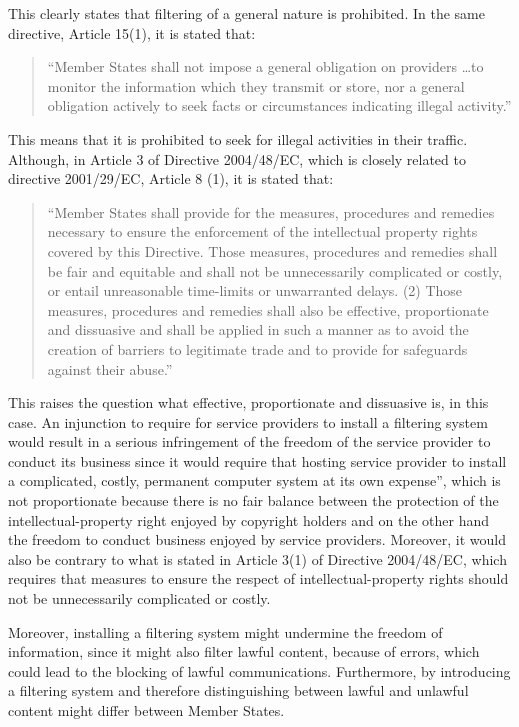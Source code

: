 This clearly states that filtering of a general nature is prohibited. In the same directive, Article 15(1), it is stated that: 

\begin{quote}``Member States shall not impose a general obligation on providers \dots to monitor the information which they transmit or store, nor a general obligation actively to seek facts or circumstances indicating illegal activity.'' \end{quote}

This means that it is prohibited to seek for illegal activities in their traffic. Although, in Article 3 of Directive 2004/48/EC, which is closely related to directive 2001/29/EC, Article 8 (1), it is stated that: 

\begin{quote}``Member States shall provide for the measures, procedures and remedies necessary to ensure the enforcement of the intellectual property rights covered by this Directive. Those measures, procedures and remedies shall be fair and equitable and shall not be unnecessarily complicated or costly, or entail unreasonable time-limits or unwarranted delays.
(2) Those measures, procedures and remedies shall also be effective, proportionate and dissuasive and shall be applied in such a manner as to avoid the creation of barriers to legitimate trade and to provide for safeguards against their abuse.''\end{quote}

This raises the question what effective, proportionate and dissuasive is, in this case. An injunction to require for service providers to install a filtering system would result in a serious infringement of the freedom of the service provider to conduct its business since it would require that hosting service provider to install a complicated, costly, permanent computer system at its own expense”, which is not proportionate because there is no fair balance between the protection of the intellectual-property right enjoyed by copyright holders and on the other hand the freedom to conduct business enjoyed by service providers. Moreover, it would also be contrary to what is stated in Article 3(1) of Directive 2004/48/EC, which requires that measures to ensure the respect of intellectual-property rights should not be unnecessarily complicated or costly.

Moreover, installing a filtering system might undermine the freedom of information, since it might also filter lawful content, because of errors, which could lead to the blocking of lawful communications. Furthermore, by introducing a filtering system and therefore distinguishing between lawful and unlawful content might differ between Member States.

